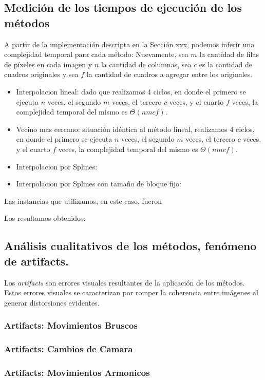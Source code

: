 \subsection{Medición de los tiempos de ejecución de los métodos}
A partir de la implementación descripta en la Sección xxx, podemos inferir una complejidad temporal para cada método:
Nuevamente, sea $m$ la cantidad de filas de píxeles en cada imagen y $n$ la cantidad de columnas, sea $c$ es la cantidad de cuadros originales y sea $f$ la cantidad de cuadros a agregar entre los originales.
\begin{itemize}
  \item Interpolacion lineal: dado que realizamos 4 ciclos, en donde el primero se ejecuta $n$ veces, el segundo $m$ veces, el tercero $c$ veces, y el cuarto $f$ veces, la complejidad temporal del mismo es $\Theta(nmcf)$.
  \item Vecino mas cercano: situación idéntica al método lineal, realizamos 4 ciclos, en donde el primero se ejecuta $n$ veces, el segundo $m$ veces, el tercero $c$ veces, y el cuarto $f$ veces, la complejidad temporal del mismo es $\Theta(nmcf)$.
  \item Interpolacion por Splines:
  \item Interpolacion por Splines con tamaño de bloque fijo:
\end{itemize}

Las instancias que utilizamos, en este caso, fueron

Los resultamos obtenidos:


\subsection{Análisis cualitativos de los métodos, fenómeno de artifacts.}
Los \textit{artifacts} son errores visuales resultantes de la aplicación de los métodos. Estos errores visuales se caracterizan por romper la coherencia entre imágenes al generar distorsiones evidentes.

\subsubsection{Artifacts: Movimientos Bruscos}

\subsubsection{Artifacts: Cambios de Camara}

\subsubsection{Artifacts: Movimientos Armonicos}
